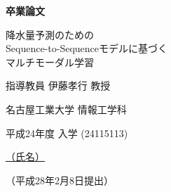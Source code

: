 \documentclass[a4j,12pt]{jarticle}
\def\title{降水量予測のための\\Sequence-to-Sequenceモデルに基づく\\マルチモーダル学習}
\def\author{林 政行}
\def\year{24}
\def\number{24115113}
\def\kyoukan{伊藤孝行}
\def\kyoukanrank{教授}
\def\teisyutubi{平成28年2月8日}
\begin{document}
\pagestyle{empty}
\baselineskip=18pt

\begin{center}

\vspace*{2cm}

{\huge \textbf{卒業論文}}

\vspace*{3cm}





\vrule width 6.25cm height 6pt depth -2pt
\vrule width 6.25cm height 6pt depth -2pt

{\LARGE {\title}}

\vspace{1zh}
\vrule width 14cm height 4pt depth 0pt

\vspace*{1cm}

指導教員 {\large {\kyoukan}} {\kyoukanrank}

\vfill

{\large 名古屋工業大学 情報工学科}

{\large 平成{\year}年度 入学 ({\number})}

\vspace*{1cm}


\underline{（氏名）\hspace{3zw}{\huge\mc {\author}}\hspace{3zw}}

\vspace*{1cm}

（{\teisyutubi}提出）

\vspace{2cm}
\end{center}
\end{document}
